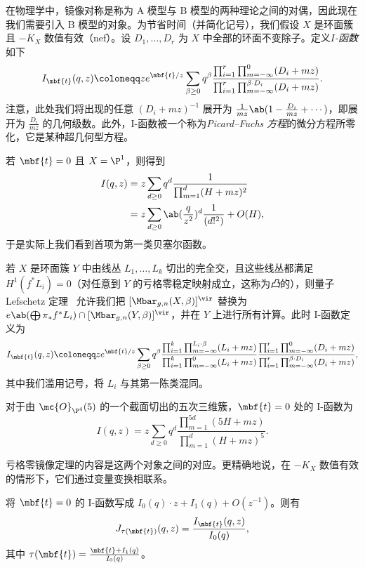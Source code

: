 在物理学中，镜像对称是称为 A 模型与 B 模型的两种理论之间的对偶，因此现在我们需要引入 B 模型的对象。为节省时间（并简化记号），我们假设 \(X\) 是环面簇且 \(-K_X\) 数值有效（nef）。设 \(D_1, \ldots, D_r\) 为 \(X\) 中全部的环面不变除子。定义\textit{\(I\)-函数}如下
\[
    I_{\mbf{t}}(q, z) \coloneqq z e^{\mbf{t}/z} \sum_{\beta \geq 0} q^{\beta} \frac{\prod_{i=1}^r \prod_{m = -\infty}^{0} (D_i + mz)}{\prod_{i=1}^r \prod_{m=-\infty}^{\beta \cdot D_i} (D_i + mz)}.
\]
注意，此处我们将出现的任意 \((D_i + mz)^{-1}\) 展开为 \(\frac{1}{mz} \ab(1 - \frac{D_i}{mz} + \cdots)\)，即展开为 \(\frac{D_i}{mz}\) 的几何级数。此外，I-函数被一个称为\textit{Picard–Fuchs 方程}的微分方程所零化，它是某种超几何型方程。

\begin{exm}
    若 \(\mbf{t} = 0\) 且 \(X = \P^1\)，则得到
    \begin{align*}
        I(q,z) &= z\sum_{d \geq 0} q^d \frac{1}{\prod_{m=1}^d (H + mz)^2} \\
        &= z\sum_{d \geq 0} \ab(\frac{q}{z^2})^d \frac{1}{(d!^2)} + O(H),
    \end{align*}
    于是实际上我们看到首项为第一类贝塞尔函数。
\end{exm}

若 \(X\) 是环面簇 \(Y\) 中由线丛 \(L_1, \ldots, L_k\) 切出的完全交，且这些线丛都满足 \(H^1(f^* L_i) = 0\)（对任意到 \(Y\) 的亏格零稳定映射成立，这称为\textit{凸}的），则量子 Lefschetz 定理~\cite{CoatesGivental2007} 允许我们把 \([\Mbar_{g,n}(X, \beta)]^{\vir}\) 替换为 \(e\ab(\bigoplus \pi_* f^* L_i) \cap [\Mbar_{g,n}(Y, \beta)]^{\vir}\)，并在 \(Y\) 上进行所有计算。此时 I-函数定义为
\[
    I_{\mbf{t}}(q,z) \coloneqq z e^{\mbf{t}/z} \sum_{\beta \geq 0} q^{\beta} \frac{\prod_{i=1}^k \prod_{m=-\infty}^{L_i \cdot \beta} (L_i + mz)}{\prod_{i=1}^k \prod_{m=-\infty}^{0} (L_i + mz)} \frac{\prod_{i=1}^r \prod_{m = -\infty}^{0} (D_i + mz)}{\prod_{i=1}^r \prod_{m=-\infty}^{\beta \cdot D_i} (D_i + mz)},
\]
其中我们滥用记号，将 \(L_i\) 与其第一陈类混同。

\begin{exm}
    对于由 \(\mc{O}_{\P^4}(5)\) 的一个截面切出的五次三维簇，\(\mbf{t} = 0\) 处的 I-函数为
    \[ I(q,z) = z \sum_{d \geq 0} q^d \frac{\prod_{m=1}^{5d}(5H+mz)}{\prod_{m=1}^d (H+mz)^5}. \]
\end{exm}

亏格零镜像定理的内容是这两个对象之间的对应。更精确地说，在 \(-K_X\) 数值有效的情形下，它们通过变量变换相联系。

\begin{thm}
    将 \(\mbf{t} = 0\) 的 I-函数写成 \(I_0(q) \cdot z + I_1(q) + O(z^{-1})\)。则有
    \[
        J_{\tau(\mbf{t})}(q,z) = \frac{I_{\mbf{t}}(q,z)}{I_0(q)},
    \]
    其中 \(\tau(\mbf{t}) = \frac{\mbf{t} + I_1(q)}{I_0(q)}\)。
\end{thm}

